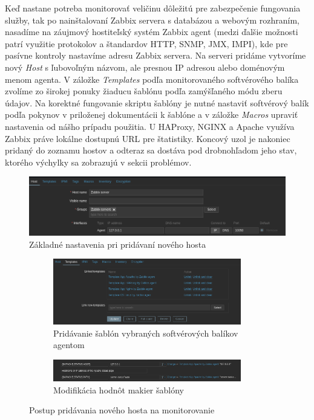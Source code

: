 \documentclass[12pt, a4paper]{article}
\begin{document}
Keď nastane potreba monitorovať veličinu dôležitú pre zabezpečenie fungovania služby, tak po nainštalovaní
Zabbix servera s databázou a webovým rozhraním, nasadíme na záujmový hostiteľský systém Zabbix agent
(medzi ďalšie možnosti patrí využitie protokolov a štandardov HTTP, SNMP, JMX, IMPI), kde pre pasívne 
kontroly nastavíme adresu Zabbix servera. Na serveri pridáme vytvoríme nový \emph{Host} s ľubovoľným názvom, 
ale presnou IP adresou  alebo doménovým menom agenta. V záložke \emph{Templates} podľa monitorovaného 
softvérového balíka zvolíme zo širokej ponuky žiaducu šablónu podľa zamýšľaného módu zberu údajov. Na 
korektné fungovanie skriptu šablóny je nutné nastaviť softvérový balík podľa pokynov v priloženej 
dokumentácii k šablóne a v záložke \emph{Macros} upraviť nastavenia od nášho prípadu použitia. U HAProxy, 
NGINX a Apache využíva Zabbix práve lokálne dostupnú URL pre štatistiky. Koncový uzol je nakoniec pridaný
do zoznamu hostov a odteraz sa dostáva pod drobnohľadom jeho stav, ktorého výchylky sa zobrazujú
v sekcii problémov.
\begin{figure}[h]
	\centering
  	\includegraphics[width=\textwidth]{images/host-config.png}
  	\caption{Základné nastavenia pri pridávaní nového hosta}
\end{figure}

\begin{figure}[h]
	\centering
	\begin{subfigure}[t]{\textwidth}
  		\centering
  		\includegraphics[width=0.9\textwidth]{images/zabbix-templates.png}
  		\caption{Pridávanie šablón vybraných softvérových balíkov agentom}
	\end{subfigure}
	\begin{subfigure}[t]{\textwidth}
  		\centering
  		\includegraphics[width=0.9\textwidth]{images/zabbix-macros.png}
  		\caption{Modifikácia hodnôt makier šablóny}
	\end{subfigure}
	\caption{Postup pridávania nového hosta na monitorovanie}
\end{figure}
\end{document}
